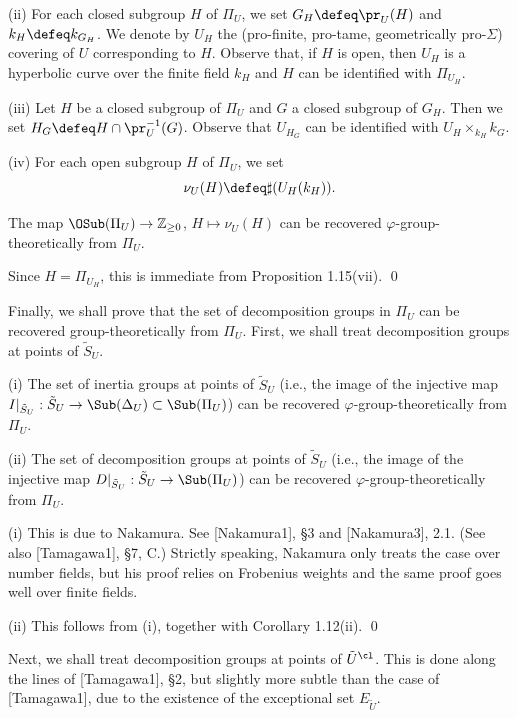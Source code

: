 \noindent
(ii) For each closed subgroup $H$ 
of $\Pi_U$, we set $G_H\defeq \pr_U(H)$ 
and $k_H\defeq k_{G_H}$. 
We denote by 
$U_H$ the (pro-finite, pro-tame, geometrically 
pro-$\Sigma$) covering of $U$ corresponding to $H$. 
Observe that, if $H$ is open, then $U_H$ is 
a hyperbolic curve over the finite field $k_{H}$ 
and $H$ can be identified with $\Pi_{U_H}$. 

\noindent
(iii) Let $H$ be a closed subgroup of $\Pi_U$ and $G$ a 
closed subgroup of $G_H$. Then we set 
$H_G\defeq H\cap\pr_U^{-1}(G)$. Observe 
that $U_{H_G}$ can be identified with $U_H\times_{k_H}k_G$. 

\noindent
(iv) For each open subgroup $H$ of $\Pi_U$, we set 
$$\nu_U(H)\defeq \sharp(U_H(k_{H})).$$
\enddefinition

The map $\OSub(\Pi_U) \to {\Bbb Z}_{\geq 0}$, 
$H\mapsto \nu_U(H)$ can be recovered 
$\varphi$-group-theoretically from $\Pi_U$. 
\endproclaim

Since $H=\Pi_{U_H}$, this is immediate from Proposition 1.15(vii). 
\qed
\enddemo

Finally, we shall prove that the set of decomposition groups in $\Pi_U$ 
can be recovered group-theoretically from $\Pi_U$. First, we shall treat 
decomposition groups at points of ${\tilde S}_U$. 

{\rm (i)} The set of inertia groups at points of ${\tilde S}_U$ 
(i.e., the image of the injective 
map $I|_{{\tilde S}_U}: {\tilde S}_U \to \Sub(\Delta_U) 
\subset \Sub(\Pi_U)$) can be recovered 
$\varphi$-group-theoretically from $\Pi_U$. 

\noindent
{\rm (ii)} The set of decomposition groups at points of ${\tilde S}_U$ 
(i.e., the image of the injective 
map $D|_{{\tilde S}_U}: {\tilde S}_U \to \Sub(\Pi_U)$) 
can be recovered $\varphi$-group-theoretically from $\Pi_U$. 
\endproclaim

(i) This is due to Nakamura. See [Nakamura1], \S 3 and 
[Nakamura3], 2.1. (See also [Tamagawa1], \S 7, C.)
Strictly speaking, 
Nakamura only treats the case over number fields, but his proof relies 
on Frobenius weights and the same proof goes well over finite fields.

\noindent
(ii) This follows from (i), together with Corollary 1.12(ii). 
\qed
\enddemo

Next, we shall treat decomposition groups at points of ${\tilde U}^{\cl}$. 
This is done along the lines of [Tamagawa1], \S 2, but slightly more subtle 
than the case of [Tamagawa1], due to the existence of the exceptional 
set $E_{\tilde U}$. 

